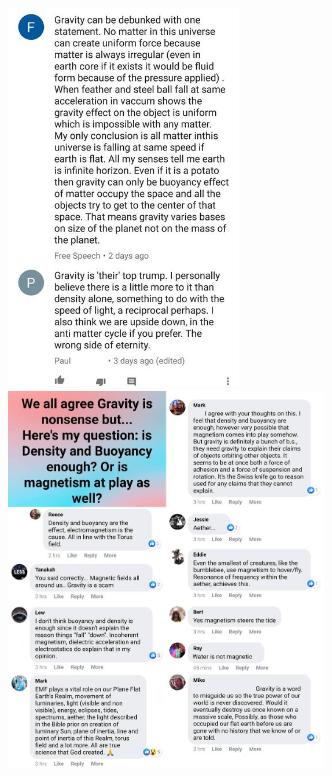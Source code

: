 \includegraphics[height=10cm]{images/gravity_stupid/stupid9}
\includegraphics[height=10cm]{images/gravity_stupid/stupid10}

